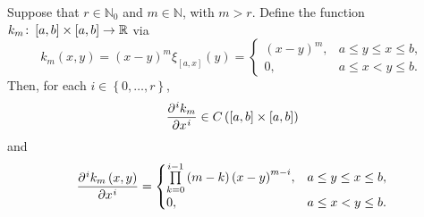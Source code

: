 \begin{frame}
	\begin{theorem}[kernel]
		Suppose that $r\in\mathbb{N}_{0}$ and $m\in\mathbb{N}$, with
		$m>r$.
		Define the function
		\begin{math}
			k_{m}\colon
			\left[a,b\right]\times\left[a,b\right]\to
			\mathbb{R}
		\end{math}
		via
		\begin{equation*}
			k_{m}\left(x,y\right)=
				{\left(x-y\right)}^{m}
			\xi_{\left[a,x\right]}\left(y\right)=
			\begin{cases}
				\left(x-y\right)^{m}, & a\leq y\leq x\leq b, \\
				0,                    & a\leq x< y\leq b.
			\end{cases}
		\end{equation*}
		Then, for each $i\in\left\{0,\dotsc,r\right\}$,
		\begin{equation*}
			\diffp[i]{k_{m}}{x}\in
			C\left(\interval\times\interval\right)
		\end{equation*}
		and
		\begin{equation*}
			\diffp[i]{k_{m}\left(x,y\right)}{x}=
			\begin{cases}
				\prod\limits_{k=0}^{i-1}
				\left(m-k\right)
				{\left(x-y\right)}^{m-i}, & a\leq y\leq x\leq b, \\
				0,                        & a\leq x< y\leq b.
			\end{cases}
		\end{equation*}
	\end{theorem}
\end{frame}

